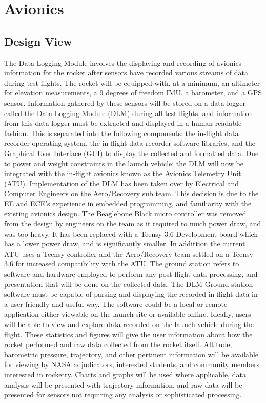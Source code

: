 \documentclass[onecolumn, draftclsnofoot,10pt, compsoc]{IEEEtran}
\begin{document}
\section{Avionics}
\subsection{Design View}
The Data Logging Module involves the displaying and recording of avionics information for the rocket after sensors have recorded various streams of data during test flights.
The rocket will be equipped with, at a minimum, an altimeter for elevation measurements, a 9 degrees of freedom IMU, a barometer, and a GPS sensor. Information gathered by these sensors will be stored on a data logger called the Data Logging Module (DLM) during all test flights, and information from this data logger must be extracted and displayed in a human-readable fashion. This is separated into the following components: the in-flight data recorder operating system, the in flight data recorder software libraries, and the Graphical User Interface (GUI) to display the collected and formatted data. Due to power and weight constraints in the launch vehicle: the DLM will now be integrated with the in-flight avionics known as the Avionics Telemetry Unit (ATU). Implementation of the DLM has been taken over by Electrical and Computer Engineers on the Aero/Recovery sub team. This decision is due to the EE and ECE's experience in embedded programming, and familiarity with the existing avionics design. The Beaglebone Black micro controller was removed from the design by engineers on the team as it required to much power draw, and was too heavy. It has been replaced with a Teensy 3.6 Development board which has a lower power draw, and is significantly smaller. In addittion the current ATU uses a Teensy controller and the Aero/Recovery team settled on a Teensy 3.6 for increased compatibility with the ATU. The ground station refers to software and hardware employed to perform any post-flight data processing, and presentation that will be done on the collected data.
The DLM Ground station software must be capable of parsing and displaying the recorded in-flight data in a user-friendly and useful way. The software could be a local or remote application either viewable on the launch site or available online. Ideally, users will be able to view and explore data recorded on the launch vehicle during the flight. These statistics and figures will give the user information about how the rocket performed and raw data collected from the rocket itself. Altitude, barometric pressure, trajectory, and other pertinent information will be available for viewing by NASA adjudicators, interested students, and community members interested in rocketry. Charts and graphs will be used where applicable, data analysis will be presented with trajectory information, and raw data will be presented for sensors not requiring any analysis or sophisticated processing.
\end{document}
